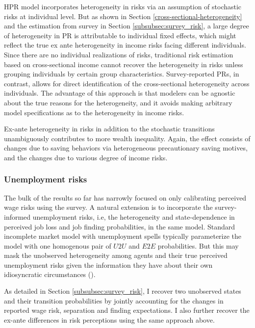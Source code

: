 HPR model incorporates heterogeneity in risks via an assumption of stochastic risks at individual level. But as shown in Section \ref{cross-sectional-heterogeneity} and the estimation from survey in Section \ref{subsubsec:survey_risk}, a large degree of heterogeneity in PR is attributable to individual fixed effects, which might reflect the true ex ante heterogeneity in income risks facing different individuals. Since there are no individual realizations of risks, traditional risk estimation based on cross-sectional income cannot recover the heterogeneity in risks unless grouping individuals by certain group characteristics. Survey-reported PRs, in contrast, allows for direct identification of the cross-sectional heterogeneity across individuals. The advantage of this approach is that modelers can be agnostic about the true reasons for the heterogeneity, and it avoids making arbitrary model specifications as to the heterogeneity in income risks.

Ex-ante heterogeneity in risks in addition to the stochastic transitions unambiguously contributes to more wealth inequality. Again, the effect consists of changes due to saving behaviors via heterogeneous precautionary saving motives, and the changes due to various degree of income risks. 

\subsubsection{Unemployment risks}

The bulk of the results so far has narrowly focused on only calibrating perceived wage risks using the survey. A natural extension is to incorporate the survey-informed unemployment risks, i.e, the heterogeneity and state-dependence in perceived job loss and job finding probabilities, in the same model. Standard incomplete market model with unemployment spells typically parameterize the model with one homogenous pair of $U2U$ and $E2E$ probabilities. But this may mask the unobserved heterogeneity among agents and their true perceived unemployment risks given the information they have about their own idiosyncratic circumstances (\cite{mueller2021expectations}).  

As detailed in Section \ref{subsubsec:survey_risk}, I recover two unobserved states and their transition probabilities by jointly accounting for the changes in reported wage risk, separation and finding expectations. I also further recover the ex-ante differences in risk perceptions using the same approach above. 

